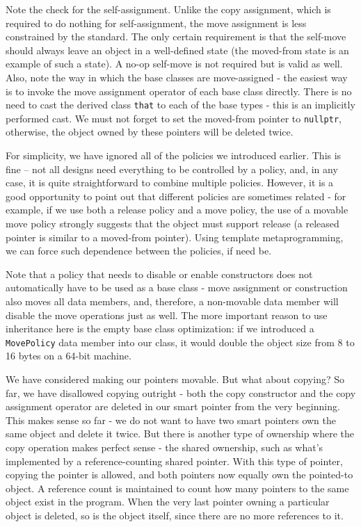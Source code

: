 Note the check for the self-assignment. Unlike the copy assignment, which is required to do nothing for self-assignment, the move assignment is less constrained by the standard. The only certain requirement is that the self-move should always leave an object in a well-defined state (the moved-from state is an example of such a state). A no-op self-move is not required but is valid as well. Also, note the way in which the base classes are move-assigned - the easiest way is to invoke the move assignment operator of each base class directly. There is no need to cast the derived class \texttt{that} to each of the base types - this is an implicitly performed cast. We must not forget to set the moved-from pointer to \texttt{nullptr}, otherwise, the object owned by these pointers will be deleted twice.

For simplicity, we have ignored all of the policies we introduced earlier. This is fine -- not all designs need everything to be controlled by a policy, and, in any case, it is quite straightforward to combine multiple policies. However, it is a good opportunity to point out that different policies are sometimes related - for example, if we use both a release policy and a move policy, the use of a movable move policy strongly suggests that the object must support release (a released pointer is similar to a moved-from pointer). Using template metaprogramming, we can force such dependence between the policies, if need be.

Note that a policy that needs to disable or enable constructors does not automatically have to be used as a base class - move assignment or construction also moves all data members, and, therefore, a non-movable data member will disable the move operations just as well. The more important reason to use inheritance here is the empty base class optimization: if we introduced a \texttt{MovePolicy} data member into our class, it would double the object size from 8 to 16 bytes on a 64-bit machine.

We have considered making our pointers movable. But what about copying? So far, we have disallowed copying outright - both the copy constructor and the copy assignment operator are deleted in our smart pointer from the very beginning. This makes sense so far - we do not want to have two smart pointers own the same object and delete it twice. But there is another type of ownership where the copy operation makes perfect sense - the shared ownership, such as what's implemented by a reference-counting shared pointer. With this type of pointer, copying the pointer is allowed, and both pointers now equally own the pointed-to object. A reference count is maintained to count how many pointers to the same object exist in the program. When the very last pointer owning a particular object is deleted, so is the object itself, since there are no more references to it.

